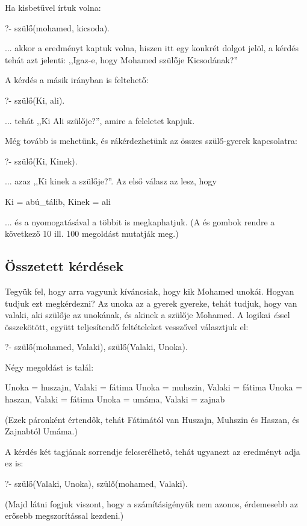 Ha kisbetűvel írtuk volna:
\begin{prolog}
?- szülő(mohamed, kicsoda).
\end{prolog}
... akkor a  eredményt kaptuk volna, hiszen  itt egy konkrét dolgot jelöl, a kérdés tehát azt jelenti: ,,Igaz-e, hogy Mohamed szülője Kicsodának?''

A kérdés a másik irányban is feltehető:
\begin{prolog}
?- szülő(Ki, ali).
\end{prolog}
... tehát ,,Ki Ali szülője?'', amire a  feleletet kapjuk.

Még tovább is mehetünk, és rákérdezhetünk az összes szülő-gyerek kapcsolatra:
\begin{prolog}
?- szülő(Ki, Kinek).
\end{prolog}
... azaz ,,Ki kinek a szülője?''. Az első válasz az lesz, hogy
\begin{prolog}
Ki = abú_tálib,
Kinek = ali
\end{prolog}
... és a  nyomogatásával a többit is megkaphatjuk. (A  és  gombok rendre a következő 10 ill. 100 megoldást mutatják meg.)

\subsection*{Összetett kérdések}

Tegyük fel, hogy arra vagyunk kíváncsiak, hogy kik
Mohamed unokái. Hogyan tudjuk ezt megkérdezni? Az
unoka az a gyerek gyereke, tehát tudjuk, hogy van
valaki, aki szülője az unokának, és akinek a
szülője Mohamed. A logikai \emph{és}\/sel
összekötött, együtt teljesítendő feltételeket
vesszővel választjuk el:
\begin{prolog}
?- szülő(mohamed, Valaki), szülő(Valaki, Unoka).
\end{prolog}
Négy megoldást is talál:
\begin{prolog}
Unoka = huszajn,
Valaki = fátima
Unoka = muhszin,
Valaki = fátima
Unoka = haszan,
Valaki = fátima
Unoka = umáma,
Valaki = zajnab
\end{prolog}
(Ezek páronként értendők, tehát Fátimától van Huszajn, Muhszin és Haszan, és Zajnabtól Umáma.)

A kérdés két tagjának sorrendje felcserélhető, tehát ugyanezt az eredményt adja ez is:
\begin{prolog}
?- szülő(Valaki, Unoka), szülő(mohamed, Valaki).
\end{prolog}
(Majd látni fogjuk viszont, hogy a számításigényük nem azonos, érdemesebb az erősebb megszorítással kezdeni.)

